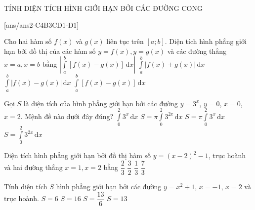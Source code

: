 \begin{dang}{TÍNH DIỆN TÍCH HÌNH GIỚI HẠN BỞI CÁC ĐƯỜNG CONG}
\end{dang}

{}[ans/ans2-C4B3CD1-D1]
\begin{ex}%
	Cho hai hàm số $f(x)$ và $g(x)$ liên tục trên $[a;b]$. Diện tích hình phẳng giới hạn bởi đồ thị của các hàm số $y=f(x), y=g(x)$ và các đường thẳng $x=a, x=b$ bằng
\choice
{$\left|\displaystyle\int\limits_a^b \left[f(x)-g(x)\right]\mathrm{\,d}x\right|$}
{$\displaystyle\int\limits_a^b \left|f(x)+g(x)\right|\mathrm{\,d}x$}
{\True $\displaystyle\int\limits_a^b \left|f(x)-g(x)\right|\mathrm{\,d}x$}
{$\displaystyle\int\limits_a^b \left[f(x)-g(x)\right]\mathrm{\,d}x$}
\end{ex}
\begin{ex}%
	Gọi $S$ là diện tích của hình phẳng giới hạn bởi các đường $y=3^x$, $y=0$, $x=0$, $x=2$. Mệnh đề nào dưới đây đúng?
\choice
{\True $\displaystyle\int\limits_0^2 3^x\mathrm{\,d}x$}
{$S=\pi\displaystyle\int\limits_0^2 3^{2x}\mathrm{\,d}x$}
{$S=\pi\displaystyle\int\limits_0^2 3^x\mathrm{\,d}x$}
{$S=\displaystyle\int\limits_0^2 3^{2x}\mathrm{\,d}x$}

\end{ex}%
\begin{ex}%
	Diện tích hình phẳng giới hạn bởi đồ thị hàm số $y=(x-2)^2-1$, trục hoành và hai đường thẳng $x=1, x=2$ bằng
\choice
{\True $\dfrac{2}{3}$}
{$\dfrac{3}{2}$}
{$\dfrac{1}{3}$}
{$\dfrac{7}{3}$}

\end{ex}
\begin{ex}%
	Tính diện tích $S$ hình phẳng giới hạn bởi các đường $y=x^2+1$, $x=-1$, $x=2$ và trục hoành.
\choice
{\True $S=6$}
{$S=16$}
{$S=\dfrac{13}{6}$}
{$S=13$}
\end{ex}
